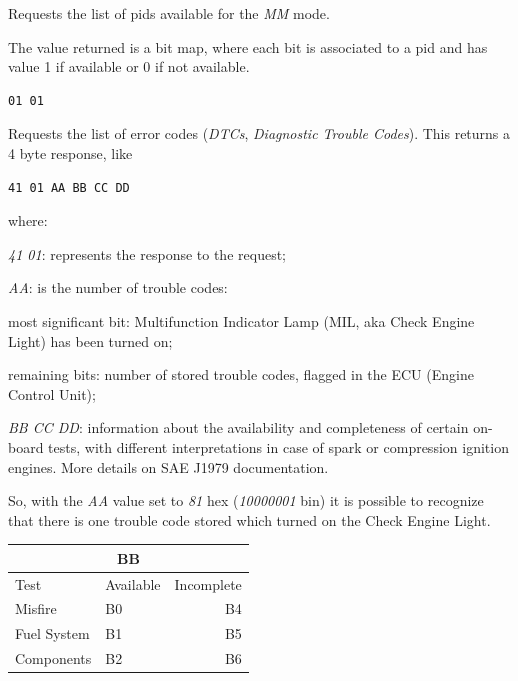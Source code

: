 \documentclass[twoside]{article}
\begin{document}
\begin{multicols}{2}
Requests the list of pids available for the \emph{MM} mode.

The value returned is a bit map, where each bit is associated to a pid and has value 1 if available or 0 if not available.

\begin{lstlisting}[language=bash]
01 01
\end{lstlisting}
Requests the list of error codes (\emph{DTCs}, \emph{Diagnostic Trouble Codes}).
This returns a 4 byte response, like
\begin{lstlisting}[language=bash]
41 01 AA BB CC DD
\end{lstlisting}
where:
\begin{compactitem}
  \item \emph{41 01}: represents the response to the request;
  \item \emph{AA}: is the number of trouble codes:
  \begin{compactitem}
    \item most significant bit: Multifunction Indicator Lamp (MIL, aka Check Engine Light) has been turned on;
    \item remaining bits: number of stored trouble codes, flagged in the ECU (Engine Control Unit);
  \end{compactitem}
  \item \emph{BB CC DD}: information about the availability and completeness of certain on-board tests, with different interpretations in case of spark or compression ignition engines. More details on SAE J1979 documentation.
\end{compactitem}

So, with the \emph{AA} value set to \emph{81} hex (\emph{10000001} bin) it is possible to recognize that there is one trouble code stored which turned on the Check Engine Light.

\begin{table}[H]
\centering
\begin{tabular}{llr}
\multicolumn{3}{c}{BB} \\
\toprule
Test & Available & Incomplete \\
\midrule
Misfire & B0 & B4 \\          
Fuel System & B1 & B5 \\
Components & B2 & B6 \\
\bottomrule
\end{tabular}
\end{table}


\end{multicols}
\end{document}

